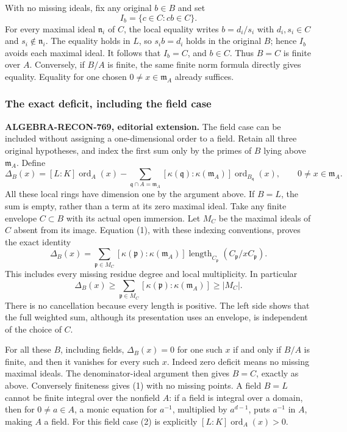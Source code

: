 With no missing ideals, fix any original \(b\in B\) and set \[
 I_b=\{c\in C:cb\in C\}.
\] For every maximal ideal \(\mathfrak n_i\) of \(C\), the local equality writes \(b=d_i/s_i\) with \(d_i,s_i\in C\) and \(s_i\notin\mathfrak n_i\). The equality holds in \(L\), so \(s_i b=d_i\) holds in the original \(B\); hence \(I_b\) avoids each maximal ideal. It follows that \(I_b=C\), and \(b\in C\). Thus \(B=C\) is finite over \(A\). Conversely, if \(B/A\) is finite, the same finite norm formula directly gives equality. Equality for one chosen \(0\ne x\in\mathfrak m_A\) already suffices.

\subsubsection{The exact deficit, including the field case}\label{the-exact-deficit-including-the-field-case}

\textbf{ALGEBRA-RECON-769, editorial extension.} The field case can be included without assigning a one-dimensional order to a field. Retain all three original hypotheses, and index the first sum only by the primes of \(B\) lying above \(\mathfrak m_A\). Define \[
 \Delta_B(x)
 =
 [L:K]\operatorname{ord}_A(x)
 -
 \sum_{\mathfrak q\cap A=\mathfrak m_A}
       [\kappa(\mathfrak q):\kappa(\mathfrak m_A)]
       \operatorname{ord}_{B_{\mathfrak q}}(x),
 \qquad 0\ne x\in\mathfrak m_A.
 \tag{2}
\] All these local rings have dimension one by the argument above. If \(B=L\), the sum is empty, rather than a term at its zero maximal ideal. Take any finite envelope \(C\subset B\) with its actual open immersion. Let \(M_C\) be the maximal ideals of \(C\) absent from its image. Equation (1), with these indexing conventions, proves the exact identity \[
 \Delta_B(x)=
 \sum_{\mathfrak p\in M_C}
     [\kappa(\mathfrak p):\kappa(\mathfrak m_A)]
     \operatorname{length}_{C_{\mathfrak p}}
                          (C_{\mathfrak p}/xC_{\mathfrak p}).
 \tag{3}
\] This includes every missing residue degree and local multiplicity. In particular \[
 \Delta_B(x)\geq
 \sum_{\mathfrak p\in M_C}
       [\kappa(\mathfrak p):\kappa(\mathfrak m_A)]
 \geq |M_C|.
\] There is no cancellation because every length is positive. The left side shows that the full weighted sum, although its presentation uses an envelope, is independent of the choice of \(C\).

For all these \(B\), including fields, \(\Delta_B(x)=0\) for one such \(x\) if and only if \(B/A\) is finite, and then it vanishes for every such \(x\). Indeed zero deficit means no missing maximal ideals. The denominator-ideal argument then gives \(B=C\), exactly as above. Conversely finiteness gives (1) with no missing points. A field \(B=L\) cannot be finite integral over the nonfield \(A\): if a field is integral over a domain, then for \(0\ne a\in A\), a monic equation for \(a^{-1}\), multiplied by \(a^{d-1}\), puts \(a^{-1}\) in \(A\), making \(A\) a field. For this field case (2) is explicitly \([L:K]\operatorname{ord}_A(x)>0\).

